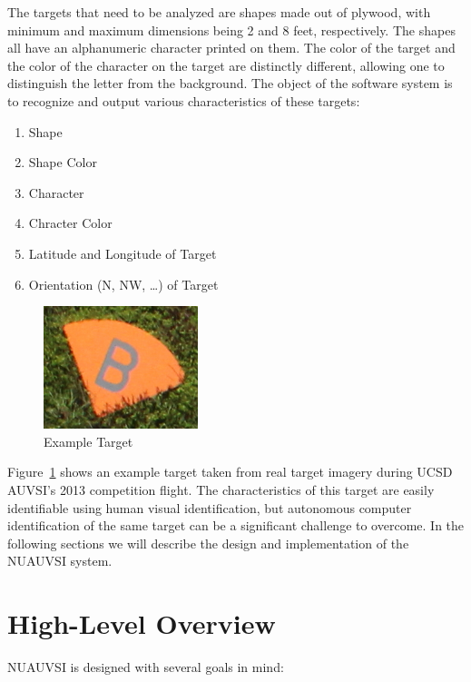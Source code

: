 \documentclass{article}
\begin{document}
The targets that need to be analyzed are shapes made out of plywood, with minimum and maximum dimensions being 2 and 8 feet, respectively. The shapes all have an alphanumeric character printed on them. The color of the target and the color of the character on the target are distinctly different, allowing one to distinguish the letter from the background. The object of the software system is to recognize and output various characteristics of these targets:

\begin{enumerate}
\item Shape
\item Shape Color
\item Character
\item Chracter Color
\item Latitude and Longitude of Target
\item Orientation (N, NW, \ldots) of Target
\end{enumerate}

\begin{figure}[!hbtp]
	\centering
		\includegraphics[width=0.4\textwidth]{target_example.jpg}
	\caption{Example Target}
	\label{fig:example_target}
\end{figure}

Figure~\ref{fig:example_target} shows an example target taken from real target imagery during UCSD AUVSI's 2013 competition flight. The characteristics of this target are easily identifiable using human visual identification, but autonomous computer identification of the same target can be a significant challenge to overcome. In the following sections we will describe the design and implementation of the NUAUVSI system.

\section{High-Level Overview}

NUAUVSI is designed with several goals in mind: 
 
\end{document}
